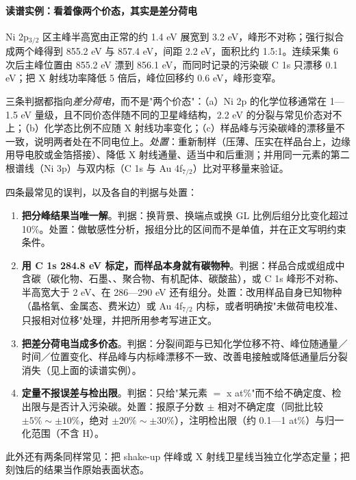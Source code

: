 \paragraph{读谱实例：看着像两个价态，其实是差分荷电}
\begin{obs}
Ni 2p$_{3/2}$ 区主峰半高宽由正常的约 1.4 eV 展宽到 3.2 eV，峰形不对称；强行拟合成两个峰得到 855.2 eV 与 857.4 eV，间距 2.2 eV，面积比约 1.5:1。连续采集 6 次后主峰位置由 855.2 eV 漂到 856.1 eV，而同时记录的污染碳 C 1s 只漂移 0.1 eV；把 X 射线功率降低 5 倍后，峰位回移约 0.6 eV，峰形变窄。
\end{obs}
\begin{infer}
三条判据都指向\emph{差分荷电}，而不是"两个价态"：（a）Ni 2p 的化学位移通常在 1—1.5 eV 量级，且不同价态伴随不同的卫星峰结构，2.2 eV 的分裂与常见价态对不上；（b）化学态比例不应随 X 射线功率变化；（c）样品峰与污染碳峰的漂移量不一致，说明两者处在不同电位上。\emph{处置}：重新制样（压薄、压实在样品台上，边缘用导电胶或金箔搭接）、降低 X 射线通量、适当中和后重测；并用同一元素的第二根谱线（Ni 3p）与双内标（C 1s 与 Au 4f$_{7/2}$）比对平移量来验证。
\end{infer}

\begin{pitfall}
四条最常见的误判，以及各自的判据与处置：
\begin{enumerate}
\item \textbf{把分峰结果当唯一解}。判据：换背景、换端点或换 GL 比例后组分比变化超过 10\%。处置：做敏感性分析，报组分比的区间而不是单值，并在正文写明约束条件。
\item \textbf{用 C 1s 284.8 eV 标定，而样品本身就有碳物种}。判据：样品合成或组成中含碳（碳化物、石墨、、聚合物、有机配体、碳酸盐），或 C 1s 峰形不对称、半高宽大于 2 eV、在 286—290 eV 还有组分。处置：改用样品自身已知物种（晶格氧、金属态、费米边）或 Au 4f$_{7/2}$ 内标，或者明确按"未做荷电校准、只报相对位移"处理，并把所用参考写进正文。
\item \textbf{把差分荷电当成多价态}。判据：分裂间距与已知化学位移不符、峰位随通量／时间／位置变化、样品峰与内标峰漂移不一致、改善电接触或降低通量后分裂消失（见上面的读谱实例）。
\item \textbf{定量不报误差与检出限}。判据：只给"某元素 $=$ x at\%"而不给不确定度、检出限与是否计入污染碳。处置：报原子分数 $\pm$ 相对不确定度（同批比较 $\pm5\%\sim\pm10\%$，绝对 $\pm20\%\sim\pm30\%$），注明检出限（约 0.1—1 at\%）与归一化范围（不含 H）。
\end{enumerate}
此外还有两条同样常见：把 shake-up 伴峰或 X 射线卫星线当独立化学态定量；把  刻蚀后的结果当作原始表面状态。
\end{pitfall}

